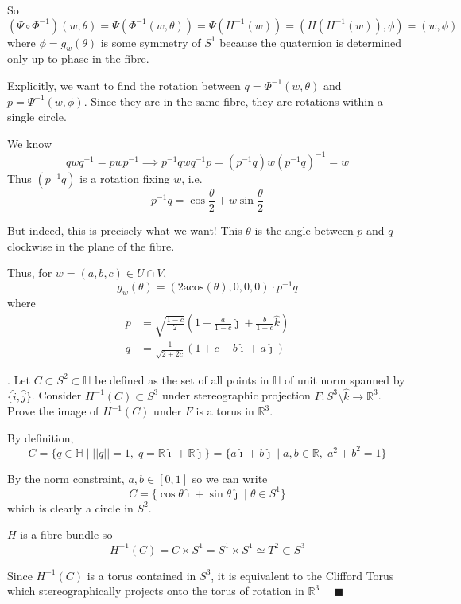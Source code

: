 \documentclass[12pt]{article}
\newcommand{\R}{\mathbb{R}}
\newcommand{\lra}{\longrightarrow}
\newcommand{\Ha}{\mathbb{H}}
\newcommand{\norm}[1]{\left\vert \left\vert #1 \right\vert \right\vert}
\newcommand{\qed}{\quad \blacksquare}
\newcommand{\ihat}{\hat \imath}
\newcommand{\jhat}{\hat \jmath}
\newcommand{\khat}{\hat k}
\begin{document}
        So 
        \[(\Psi \circ \Phi^{-1})(w, \theta) = \Psi(\Phi^{-1}(w, \theta)) = \Psi(H^{-1}(w)) = (H(H^{-1}(w)), \phi) = (w, \phi)\]
        where $\phi = g_w(\theta)$ is some symmetry of $S^1$ because the quaternion is determined only up to phase in the fibre. 

        Explicitly, we want to find the rotation between $q = \Phi^{-1}(w, \theta)$ and $p = \Psi^{-1}(w, \phi)$. Since they are in the same fibre, they are rotations within a single circle. 

        We know 
        \[qwq^{-1} = pwp^{-1} \implies p^{-1}qwq^{-1}p = (p^{-1}q)w(p^{-1}q)^{-1} = w\]
        Thus $(p^{-1}q)$ is a rotation fixing $w$, i.e. 
        \[p^{-1}q = \cos \frac{\theta}{2} + w\sin \frac{\theta}{2}\]
        
        But indeed, this is precisely what we want! This $\theta$ is the angle between $p$ and $q$ clockwise in the plane of the fibre. 

        Thus, for $w = (a, b, c) \in U \cap V$, 
        \[g_w(\theta) = (2\text{acos}(\theta), 0, 0, 0) \cdot p^{-1}q \]
        where 
        \begin{align*}
            p &= \sqrt{\frac{1 - c}{2}}\left(1 - \frac{a}{1 - c}\jhat + \frac{b}{1 - c}\khat\right)\\
            q &= \frac{1}{\sqrt{2 + 2c}}(1 + c - b\ihat + a\jhat)
        \end{align*}
    \color{black}


.  Let $C \subset S^{2} \subset \Ha$ be defined as the set of all points in $\Ha$ of unit norm spanned by $\{\hat{i}, \hat{j}\}$.  Consider $H^{-1}(C) \subset S^{3}$ under stereographic projection $F: S^{3}\setminus \hat{k} \lra \R^{3}$.  Prove the image of $H^{-1}(C)$ under $F$ is a torus in $\R^{3}$. 

    \color{blue}
        By definition, 
        \[C = \{q \in \Ha \; | \; \norm{q} = 1, \; q = \R \ihat + \R \jhat\} = \{a \ihat + b\jhat \; | \; a, b \in \R,\; a^2 + b^2 = 1\}\]

        By the norm constraint, $a, b \in [0, 1]$ so we can write 
        \[C = \{\cos \theta \ihat + \sin \theta \jhat \; | \; \theta \in S^1\}\]
        which is clearly a circle in $S^2$.

        $H$ is a fibre bundle so 
        \[H^{-1}(C) = C \times S^1 = S^1 \times S^1 \simeq T^2 \subset S^3\]
    
        Since $H^{-1}(C)$ is a torus contained in $S^3$, it is equivalent to the Clifford Torus which stereographically projects onto the torus of rotation in $\R^3$ $\qed$
\end{document}
